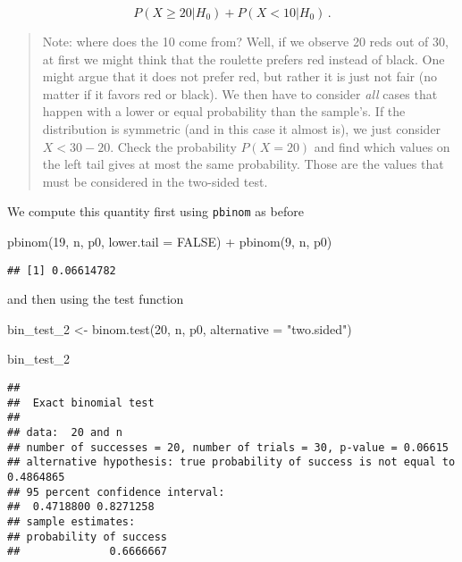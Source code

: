 \documentclass[
  oneside]{book}
\newenvironment{Shaded}{\begin{snugshade}}{\end{snugshade}}
\newcommand{\AttributeTok}[1]{\textcolor[rgb]{0.77,0.63,0.00}{#1}}
\newcommand{\ConstantTok}[1]{\textcolor[rgb]{0.00,0.00,0.00}{#1}}
\newcommand{\DecValTok}[1]{\textcolor[rgb]{0.00,0.00,0.81}{#1}}
\newcommand{\FunctionTok}[1]{\textcolor[rgb]{0.00,0.00,0.00}{#1}}
\newcommand{\NormalTok}[1]{#1}
\newcommand{\OtherTok}[1]{\textcolor[rgb]{0.56,0.35,0.01}{#1}}
\newcommand{\SpecialCharTok}[1]{\textcolor[rgb]{0.00,0.00,0.00}{#1}}
\newcommand{\StringTok}[1]{\textcolor[rgb]{0.31,0.60,0.02}{#1}}
\begin{document}
\[
P(X \geq 20 | H_0) + P(X < 10 | H_0)\,.
\]

\begin{quote}
Note: where does the 10 come from? Well, if we observe 20 reds out
of 30, at first we might think that the roulette prefers red instead
of black. One might argue that it does not prefer red, but rather
it is just not fair (no matter if it favors red or black). We then
have to consider \emph{all} cases that happen with a lower or equal
probability than the sample's. If the distribution is symmetric
(and in this case it almost is), we just consider \(X < 30 - 20\).
Check the probability \(P(X = 20)\) and find which values on the
left tail gives at most the same probability.
Those are the
values that must be considered in the two-sided test.
\end{quote}

We compute this quantity first using \texttt{pbinom} as before

\begin{Shaded}
\begin{Highlighting}[]
\FunctionTok{pbinom}\NormalTok{(}\DecValTok{19}\NormalTok{, n, p0, }\AttributeTok{lower.tail =} \ConstantTok{FALSE}\NormalTok{) }\SpecialCharTok{+} \FunctionTok{pbinom}\NormalTok{(}\DecValTok{9}\NormalTok{, n, p0)}
\end{Highlighting}
\end{Shaded}

\begin{verbatim}
## [1] 0.06614782
\end{verbatim}

and then using the test function

\begin{Shaded}
\begin{Highlighting}[]
\NormalTok{bin\_test\_2 }\OtherTok{\textless{}{-}} \FunctionTok{binom.test}\NormalTok{(}\DecValTok{20}\NormalTok{, n, p0, }\AttributeTok{alternative =} \StringTok{"two.sided"}\NormalTok{)}

\NormalTok{bin\_test\_2}
\end{Highlighting}
\end{Shaded}

\begin{verbatim}
## 
##  Exact binomial test
## 
## data:  20 and n
## number of successes = 20, number of trials = 30, p-value = 0.06615
## alternative hypothesis: true probability of success is not equal to 0.4864865
## 95 percent confidence interval:
##  0.4718800 0.8271258
## sample estimates:
## probability of success 
##              0.6666667
\end{verbatim}
\end{document}

